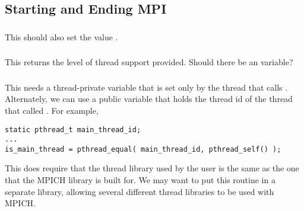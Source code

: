 \documentclass{article}
\begin{document}
\subsubsection{}

\subsubsection{}

\subsection{Starting and Ending MPI}

\subsubsection{}
\begin{adi3}
\end{adi3}

\subsubsection{}
\begin{adi3}
\end{adi3}
This should also set the value .

\subsubsection{}
This returns the level of thread support provided.  Should there be an
 variable?

\subsubsection{}
This needs a thread-private variable that is set only by the thread that calls
.  Alternately, we can use a public variable that
holds the thread id of the thread that called .  For
example, 
\begin{verbatim}
static pthread_t main_thread_id;
...
is_main_thread = pthread_equal( main_thread_id, pthread_self() );
\end{verbatim}
This does require that the thread library used by the user is the same as the
one that the MPICH library is built for.  We may want to put this routine in a
separate library, allowing several different thread libraries to be used with
MPICH. 
\end{document}
